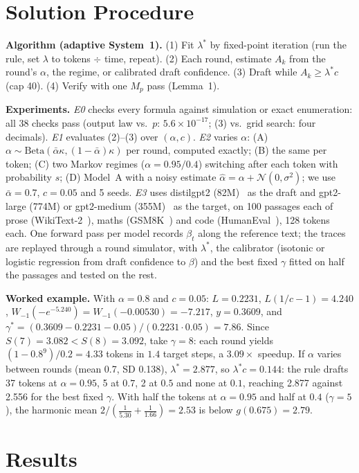 \documentclass[11pt,letterpaper]{article}
\newcommand{\abar}{\bar\alpha}
\newcommand{\lstar}{\lambda^{*}}
\begin{document}
\section{Solution Procedure}
\textbf{Algorithm (adaptive System~1).} (1) Fit $\lstar$ by fixed-point iteration (run the rule, set $\lambda$ to tokens $\div$ time, repeat). (2) Each round, estimate $A_k$ from the round's $\alpha$, the regime, or calibrated draft confidence. (3) Draft while $A_k\ge\lstar c$ (cap 40). (4) Verify with one $M_p$ pass (Lemma~1).

\textbf{Experiments.} \emph{E0} checks every formula against simulation or exact enumeration: all 38 checks pass (output law vs.\ $p$: $5.6\times10^{-17}$; (3) vs.\ grid search: four decimals). \emph{E1} evaluates (2)--(3) over $(\alpha,c)$. \emph{E2} varies $\alpha$: (A) $\alpha\sim\mathrm{Beta}(\abar\kappa,(1-\abar)\kappa)$ per round, computed exactly; (B) the same per token; (C) two Markov regimes ($\alpha=0.95/0.4$) switching after each token with probability $s$; (D) Model~A with a noisy estimate $\hat\alpha=\alpha+\mathcal N(0,\sigma^2)$; we use $\abar=0.7$, $c=0.05$ and 5 seeds. \emph{E3} uses distilgpt2 (82M)~\cite{distil} as the draft and gpt2-large (774M) or gpt2-medium (355M)~\cite{gpt2} as the target, on 100 passages each of prose (WikiText-2~\cite{wikitext}), maths (GSM8K~\cite{gsm8k}) and code (HumanEval~\cite{humaneval}), 128 tokens each. One forward pass per model records $\beta_t$ along the reference text; the traces are replayed through a round simulator, with $\lstar$, the calibrator (isotonic or logistic regression from draft confidence to $\beta$) and the best fixed $\gamma$ fitted on half the passages and tested on the rest.

\textbf{Worked example.} With $\alpha=0.8$ and $c=0.05$: $L=0.2231$, $L(1/c-1)=4.240$, $W_{-1}(-e^{-5.240})=W_{-1}(-0.00530)=-7.217$, $y=0.3609$, and $\gamma^*=(0.3609-0.2231-0.05)/(0.2231\cdot0.05)=7.86$. Since $S(7)=3.082<S(8)=3.092$, take $\gamma=8$: each round yields $(1-0.8^9)/0.2=4.33$ tokens in $1.4$ target steps, a $3.09\times$ speedup. If $\alpha$ varies between rounds (mean 0.7, SD 0.138), $\lstar=2.877$, so $\lstar c=0.144$: the rule drafts 37 tokens at $\alpha=0.95$, 5 at $0.7$, 2 at $0.5$ and none at $0.1$, reaching 2.877 against 2.556 for the best fixed $\gamma$. With half the tokens at $\alpha=0.95$ and half at $0.4$ ($\gamma=5$), the harmonic mean $2/(\tfrac1{5.30}+\tfrac1{1.66})=2.53$ is below $g(0.675)=2.79$.

\section{Results}
\end{document}
